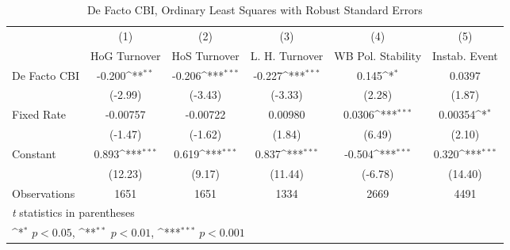 \begin{table}[htbp]\centering
\def\sym#1{\ifmmode^{#1}\else\(^{#1}\)\fi}
\caption{De Facto CBI, Ordinary Least Squares with Robust Standard Errors \label{multIndOLSDF}}
\begin{tabular}{l*{5}{c}}
\toprule
                                        &\multicolumn{1}{c}{(1)}&\multicolumn{1}{c}{(2)}&\multicolumn{1}{c}{(3)}&\multicolumn{1}{c}{(4)}&\multicolumn{1}{c}{(5)}\\
                                        &\multicolumn{1}{c}{HoG Turnover}&\multicolumn{1}{c}{HoS Turnover}&\multicolumn{1}{c}{L. H. Turnover}&\multicolumn{1}{c}{WB Pol. Stability}&\multicolumn{1}{c}{Instab. Event}\\
\midrule
De Facto CBI                            &   -0.200\sym{**} &   -0.206\sym{***}&   -0.227\sym{***}&    0.145\sym{*}  &   0.0397         \\
                                        &  (-2.99)         &  (-3.43)         &  (-3.33)         &   (2.28)         &   (1.87)         \\
\addlinespace
Fixed Rate                              & -0.00757         & -0.00722         &  0.00980         &   0.0306\sym{***}&  0.00354\sym{*}  \\
                                        &  (-1.47)         &  (-1.62)         &   (1.84)         &   (6.49)         &   (2.10)         \\
\addlinespace
Constant                                &    0.893\sym{***}&    0.619\sym{***}&    0.837\sym{***}&   -0.504\sym{***}&    0.320\sym{***}\\
                                        &  (12.23)         &   (9.17)         &  (11.44)         &  (-6.78)         &  (14.40)         \\
\midrule
Observations                            &     1651         &     1651         &     1334         &     2669         &     4491         \\
\bottomrule
\multicolumn{6}{l}{\footnotesize \textit{t} statistics in parentheses}\\
\multicolumn{6}{l}{\footnotesize \sym{*} \(p<0.05\), \sym{**} \(p<0.01\), \sym{***} \(p<0.001\)}\\
\end{tabular}
\end{table}
